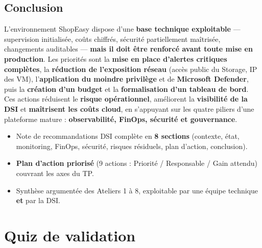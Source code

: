 \documentclass[11pt,a4paper]{article}
\begin{document}
\subsection{Conclusion}
L'environnement ShopEasy dispose d'une \textbf{base technique exploitable} — supervision initialisée, coûts chiffrés, sécurité partiellement maîtrisée, changements auditables — \textbf{mais il doit être renforcé avant toute mise en production}. Les priorités sont la \textbf{mise en place d'alertes critiques complètes}, la \textbf{réduction de l'exposition réseau} (accès public du Storage, IP des VM), l'\textbf{application du moindre privilège} et de \textbf{Microsoft Defender}, puis la \textbf{création d'un budget} et la \textbf{formalisation d'un tableau de bord}. Ces actions réduisent le \textbf{risque opérationnel}, améliorent la \textbf{visibilité de la DSI} et \textbf{maîtrisent les coûts cloud}, en s'appuyant sur les quatre piliers d'une plateforme mature : \textbf{observabilité, FinOps, sécurité et gouvernance}.

\begin{etatbox}
\begin{itemize}
  \item Note de recommandations DSI complète en \textbf{8 sections} (contexte, état, monitoring, FinOps, sécurité, risques résiduels, plan d'action, conclusion).
  \item \textbf{Plan d'action priorisé} (9 actions : Priorité / Responsable / Gain attendu) couvrant les axes du TP.
  \item Synthèse argumentée des Ateliers 1 à 8, exploitable par une équipe technique \textbf{et} par la DSI.
\end{itemize}
\end{etatbox}


\section{Quiz de validation}
\end{document}
